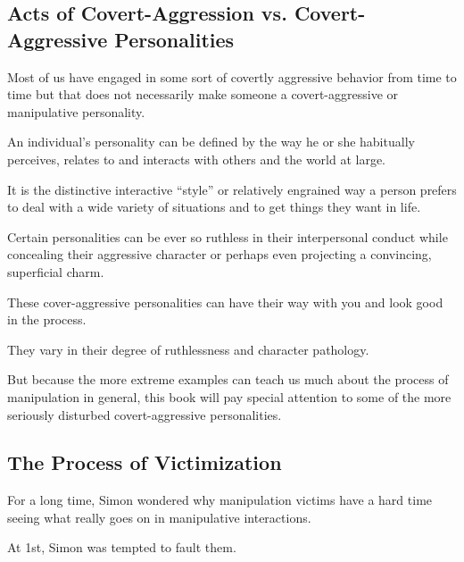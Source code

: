 \documentclass[oneside]{book}
\numberwithin{equation}{section}
\begin{document}
\subsection*{Acts of Covert-Aggression vs. Covert-Aggressive Personalities}
Most of us have engaged in some sort of covertly aggressive behavior from time to time but that does not necessarily make someone a covert-aggressive or manipulative personality.

An individual's personality can be defined by the way he or she habitually perceives, relates to and interacts with others and the world at large.

It is the distinctive interactive ``style'' or relatively engrained way a person prefers to deal with a wide variety of situations and to get things they want in life.

Certain personalities can be ever so ruthless in their interpersonal conduct while concealing their aggressive character or perhaps even projecting a convincing, superficial charm.

These cover-aggressive personalities can have their way with you and look good in the process.

They vary in their degree of ruthlessness and character pathology.

But because the more extreme examples can teach us much about the process of manipulation in general, this book will pay special attention to some of the more seriously disturbed covert-aggressive personalities.

\subsection*{The Process of Victimization}
For a long time, Simon wondered why manipulation victims have a hard time seeing what really goes on in manipulative interactions.

At 1st, Simon was tempted to fault them.
\end{document}
